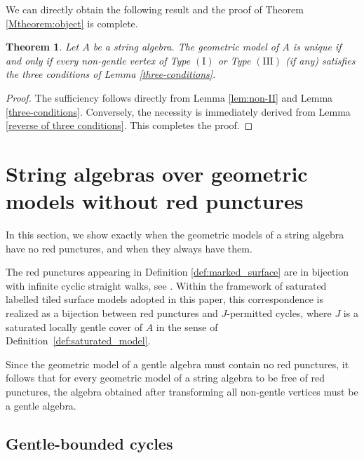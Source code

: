 \documentclass[11pt]{amsart}
\numberwithin{equation}{section}
\newtheorem{theorem}{Theorem}[section]
\theoremstyle{definition}
\begin{document}
 

We can directly obtain the following result and the proof of Theorem \ref{Mtheorem:object}  is complete.

\begin{theorem}\label{main-theorem}
Let $A$ be a string algebra. The geometric model of $A$ is unique if and only if every non-gentle vertex of Type $\mathrm{(I)}$ or Type $\mathrm{(III)}$ (if any) satisfies the three conditions of Lemma \ref{three-conditions}.
\end{theorem}

\begin{proof}
The sufficiency follows directly from Lemma \ref{lem:non-II} and Lemma \ref{three-conditions}. Conversely, the necessity is immediately derived from Lemma \ref{reverse of three conditions}. This completes the proof.
\end{proof}




\section{String algebras over geometric models without red punctures}
\label{section:String algebras over geometric models of red punctures}
In this section, we show exactly when the geometric models of a string algebra have no red punctures, and when they always have them.

The red punctures appearing in Definition \ref{def:marked_surface} are in bijection with
infinite cyclic straight walks, see \cite[Remark~4.11(i)]{PPP19}. Within the framework of saturated labelled tiled surface models adopted in this paper, this correspondence is realized as a bijection between red punctures and \(J\)-permitted cycles, where \(J\) is a saturated locally gentle cover of \(A\) in the sense of
Definition~\ref{def:saturated_model}.

 Since the geometric model of a gentle algebra must contain no red punctures, it follows that for every geometric model of a string algebra to be free of red punctures, the algebra obtained after transforming all non-gentle vertices must be a gentle algebra.
\subsection{Gentle-bounded cycles}
\end{document}
